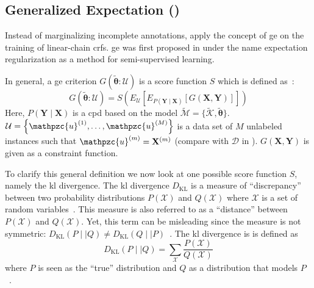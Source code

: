 \subsection{Generalized Expectation ()}

Instead of marginalizing incomplete annotations, \citet{mann2008generalized} apply the concept of \acrfull{ge} on the training of linear-chain \glspl{crf}.
\Gls{ge} was first proposed in \citet{mann2007simple} under the name \gls{expectation regularization} as a method for semi-supervised learning.


In general, a \gls{ge} criterion $G(\bm{\tilde{\theta}}:\mathcal{U})$ is a score function $S$ which is defined as~\citep{mann2010generalized}:
\begin{equation}
  \label{equ:generalized-expectation}
  G(\bm{\tilde{\theta}}:\mathcal{U})=S\left(E_{\mathcal{U}}\left[E_{P(\mathbf{Y}\mid\mathbf{X})}\left[G(\mathbf{X},\mathbf{Y})\right]\right]\right)
\end{equation}
Here, $P(\mathbf{Y}\mid\mathbf{X})$ is a \gls{cpd} based on the model $\tilde{\mathcal{M}}=\{\tilde{\mathcal{K}},\bm{\tilde{\theta}}\}$.
$\mathcal{U}=\left\{\mathpzc{u}^{(1)},\dots,\mathpzc{u}^{(M)}\right\}$ is a data set of $M$ unlabeled instances such that $\mathpzc{u}^{(m)}=\mathbf{X}^{(m)}$ (compare with $\mathcal{D}$ in ).
$G(\mathbf{X},\mathbf{Y})$ is given as a constraint function.


\bigskip

To clarify this general definition we now look at one possible score function $S$, namely the \acrfull{kl} divergence.
The \gls{kl} divergence $D_{\text{KL}}$ is a measure of ``discrepancy'' between two probability distributions $P(\mathcal{X})$ and $Q(\mathcal{X})$ where $\mathcal{X}$ is a set of \glspl{random variable}~\citep{burnham2003model}.
This measure is also referred to as a ``distance'' between $P(\mathcal{X})$ and $Q(\mathcal{X})$.
Yet, this term can be misleading since the measure is not symmetric: $D_{\text{KL}}(P\mid\mid Q)\neq D_{\text{KL}}(Q\mid\mid P)$~\citep{burnham2003model}.
The \gls{kl} divergence is is defined as~\citep{mackay2003information}
\begin{equation}
  \label{equ:kl-divergence}
  D_{\text{KL}}(P\mid\mid Q)=\sum_\mathcal{X} \frac{P(\mathcal{X})}{Q(\mathcal{X})}
\end{equation}
where $P$ is seen as the ``true'' distribution and $Q$ as a distribution that models $P$~\citep{burnham2003model}.

